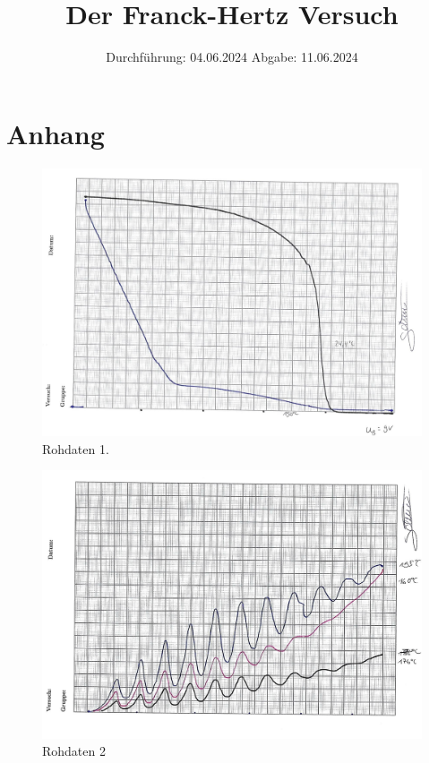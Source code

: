 

\subject{V601}
\title{Der Franck-Hertz Versuch}
\date{%
  Durchführung: 04.06.2024
  \hspace{3em}
  Abgabe: 11.06.2024
}



\maketitle
\thispagestyle{empty}
\tableofcontents
\newpage






\printbibliography{}

\section{Anhang}
\begin{figure}[H]
  \includegraphics[width=\textwidth]{Bilder/1.jpg}
  \caption{Rohdaten 1.}
  \label{fig:3}
\end{figure}

\begin{figure}[H]
  \includegraphics[width=\textwidth]{Bilder/2.jpg}
  \caption{Rohdaten 2}
  \label{fig:4}
\end{figure}


